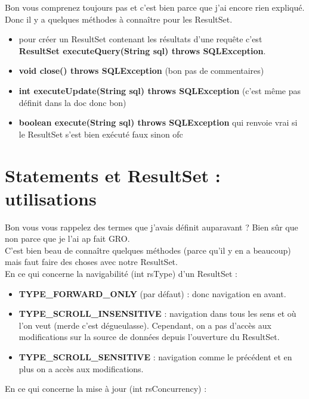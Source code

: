 \documentclass{report}
\begin{document}
Bon vous comprenez toujours pas et c'est bien parce que j'ai encore rien expliqué. Donc il y a quelques méthodes à connaître pour les ResultSet.
\begin{itemize}
\item pour créer un ResultSet contenant les résultats d'une requête c'est \textbf{ResultSet executeQuery(String sql) throws SQLException}.
\item \textbf{void close() throws SQLException} (bon pas de commentaires)
\item \textbf{int executeUpdate(String sql) throws SQLException} (c'est même pas définit dans la doc donc bon)
\item \textbf{boolean execute(String sql) throws SQLException} qui renvoie vrai si le ResultSet s'est bien exécuté faux sinon ofc
\end{itemize}

\section{Statements et ResultSet : utilisations}
Bon vous vous rappelez des termes que j'avais définit auparavant ? Bien sûr que non parce que je l'ai ap fait GRO.\\
C'est bien beau de connaître quelques méthodes (parce qu'il y en a beaucoup) mais faut faire des choses avec notre ResultSet.\\
En ce qui concerne la navigabilité (int rsType) d'un ResultSet :
\begin{itemize}
\item \textbf{TYPE\_FORWARD\_ONLY} (par défaut) : donc navigation en avant.
\item \textbf{TYPE\_SCROLL\_INSENSITIVE} : navigation dans tous les sens et où l'on veut (merde c'est dégueulasse). Cependant, on a pas d'accès aux modifications sur la source de données depuis l'ouverture du ResultSet.
\item \textbf{TYPE\_SCROLL\_SENSITIVE} : navigation comme le précédent et en plus on a accès aux modifications.\\
\end{itemize}
En ce qui concerne la mise à jour (int rsConcurrency) :
\end{document}

